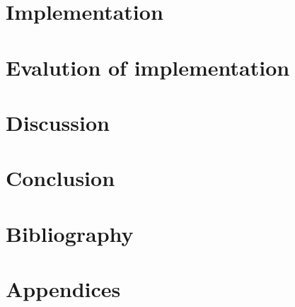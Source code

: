 \documentclass{article}
\begin{document}
\section{Implementation}
\label{sec:impl}

\clearpage

\section{Evalution of implementation}
\label{sec:evaluation}

\clearpage

\section{Discussion}
\label{sec:discussion}

\clearpage

\section{Conclusion}
\label{sec:conclusion}

\clearpage

\section{Bibliography}

\clearpage

\section{Appendices}

\end{document}

